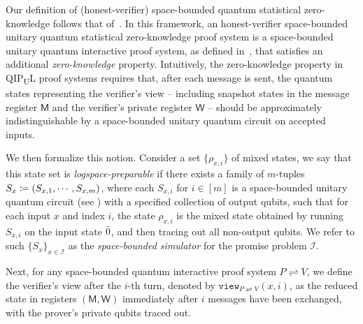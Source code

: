 \documentclass[10pt,a4paper]{article}
\numberwithin{equation}{section}
\numberwithin{figure}{section}
\newcommand{\QIPUL}{\texorpdfstring{\textnormal{\textsf{QIP}\textsubscript{\textnormal{U}}\textsf{L}}}\xspace}
\newcommand{\view}[2]{\mathtt{view}_{{#1}\rightleftharpoons{#2}}}
\newcommand{\protocol}[2]{{#1}\!\rightleftharpoons\!{#2}}
\DeclarePairedDelimiter\rbra{\lparen}{\rparen}
\let\ket\relax\DeclarePairedDelimiter\ket{\lvert}{\rangle}
\newcommand{\calI}{\mathcal{I}}
\newcommand{\sfM}{\mathsf{M}}
\newcommand{\sfW}{\mathsf{W}}
\begin{document}
Our definition of (honest-verifier) space-bounded quantum statistical zero-knowledge follows that of~\cite[Section 3.1]{Wat02QSZK}. In this framework, an honest-verifier space-bounded unitary quantum statistical zero-knowledge proof system is a space-bounded unitary quantum interactive proof system, as defined in~, that satisfies an additional \textit{zero-knowledge} property. Intuitively, the zero-knowledge property in \QIPUL{} proof systems requires that, after each message is sent, the quantum states representing the verifier's view -- including snapshot states in the message register $\sfM$ and the verifier's private register $\sfW$ -- should be approximately indistinguishable by a space-bounded unitary quantum circuit on accepted inputs. 

We then formalize this notion. Consider a set $\{\rho_{x,i}\}$ of mixed states, we say that this state set is \textit{logspace-preparable} if there exists a family of $m$-tuples $S_x \coloneqq \rbra*{S_{x,1},\cdots,S_{x,m}}$, where each $S_{x,i}$ for $i \in [m]$ is a space-bounded unitary quantum circuit (see ) with a specified collection of output qubits, such that for each input $x$ and index $i$, the state $\rho_{x,i}$ is the mixed state obtained by running $S_{x,i}$ on the input state $\ket{\bar{0}}$, and then tracing out all non-output qubits. We refer to such $\{S_x\}_{x\in\calI}$ as the \textit{space-bounded simulator} for the promise problem $\calI$. 

Next, for any space-bounded quantum interactive proof system $\protocol{P}{V}$, we define the verifier's view after the $i$-th turn, denoted by $\view{P}{V}(x,i)$, as the reduced state in registers $(\sfM,\sfW)$ immediately after $i$ messages have been exchanged, with the prover's private qubits traced out. 
\end{document}
